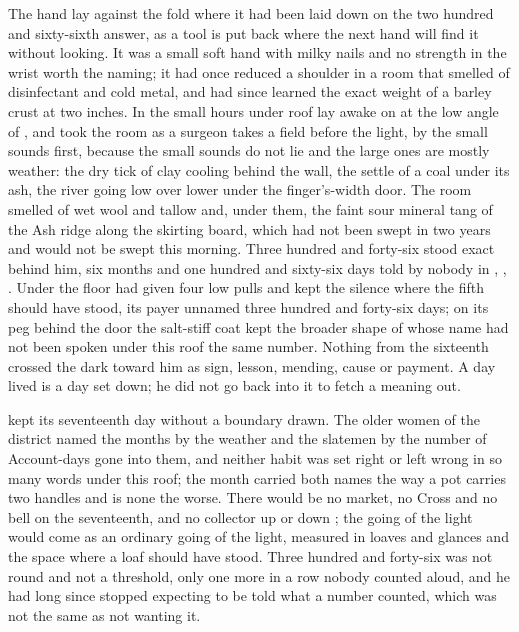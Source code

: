 
The hand lay against the fold where it had been laid down on the two hundred and sixty-sixth answer, as a tool is put back where the next hand will find it without looking. It was a small soft hand with milky nails and no strength in the wrist worth the naming; it had once reduced a shoulder in a room that smelled of disinfectant and cold metal, and had since learned the exact weight of a barley crust at two inches. In the small hours under  roof  lay awake on  at the low angle of , and took the room as a surgeon takes a field before the light, by the small sounds first, because the small sounds do not lie and the large ones are mostly weather: the dry tick of clay cooling behind the wall, the settle of a coal under its ash, the river going low over lower under the finger's-width door. The room smelled of wet wool and tallow and, under them, the faint sour mineral tang of the Ash ridge along the skirting board, which had not been swept in two years and would not be swept this morning. Three hundred and forty-six stood exact behind him, six months and one hundred and sixty-six days told by nobody in , , . Under the floor  had given four low pulls and kept the silence where the fifth should have stood, its payer unnamed three hundred and forty-six days; on its peg behind the door the salt-stiff coat kept the broader shape of  whose name had not been spoken under this roof the same number. Nothing from the sixteenth crossed the dark toward him as sign, lesson, mending, cause or payment. A day lived is a day set down; he did not go back into it to fetch a meaning out.

 kept its seventeenth day without a boundary drawn. The older women of the district named the months by the weather and the slatemen by the number of Account-days gone into them, and neither habit was set right or left wrong in so many words under this roof; the month carried both names the way a pot carries two handles and is none the worse. There would be no market, no Cross and no bell on the seventeenth, and no collector up or down ; the going of the light would come as an ordinary going of the light, measured in loaves and glances and the space where a loaf should have stood. Three hundred and forty-six was not round and not a threshold, only one more in a row nobody counted aloud, and he had long since stopped expecting to be told what a number counted, which was not the same as not wanting it.

